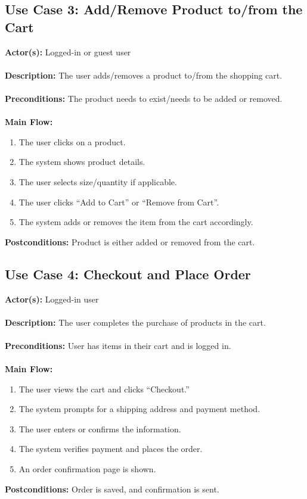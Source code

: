 \documentclass[a4paper,12pt]{article.cls}
\begin{document}
	\subsection*{Use Case 3: Add/Remove Product to/from the Cart}
	\textbf{Actor(s):} Logged-in or guest user \\ \\
	\textbf{Description:} The user adds/removes a product to/from the shopping cart. \\ \\
	\textbf{Preconditions:} The product needs to exist/needs to be added or removed. \\ \\
	\textbf{Main Flow:}
	\begin{enumerate}
  		\item The user clicks on a product.
  		\item The system shows product details.
  		\item The user selects size/quantity if applicable.
  		\item The user clicks ``Add to Cart'' or ``Remove from Cart''.
  		\item The system adds or removes the item from the cart accordingly.
	\end{enumerate}
	\textbf{Postconditions:} Product is either added or removed from the cart.
	\subsection*{Use Case 4: Checkout and Place Order}
	\textbf{Actor(s):} Logged-in user \\ \\
	\textbf{Description:} The user completes the purchase of products in the cart. \\ \\
	\textbf{Preconditions:} User has items in their cart and is logged in. \\ \\
	\textbf{Main Flow:}
	\begin{enumerate}
  		\item The user views the cart and clicks ``Checkout.''
  		\item The system prompts for a shipping address and payment method.
  		\item The user enters or confirms the information.
  		\item The system verifies payment and places the order.
  		\item An order confirmation page is shown.
	\end{enumerate}
	\textbf{Postconditions:} Order is saved, and confirmation is sent.
\end{document}
